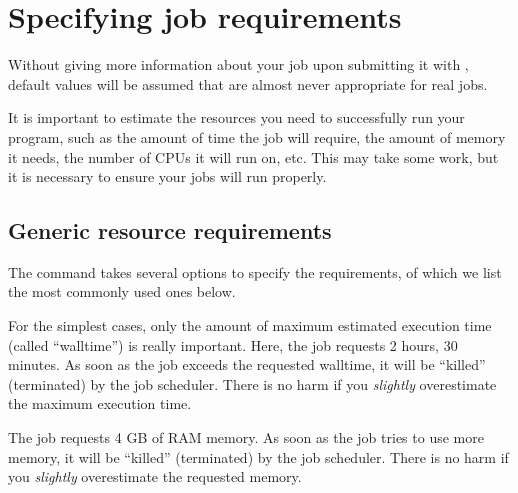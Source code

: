\section{Specifying job requirements}

Without giving more information about your job upon submitting it with
, default values will be assumed that are almost never appropriate
for real jobs.

It is important to estimate the resources you need to successfully run your
program, such as the amount of time the job will require, the amount of memory
it needs, the number of CPUs it will run on, etc. This may take some work, but
it is necessary to ensure your jobs will run properly.

\subsection{Generic resource requirements}
\label{subsec:generic-resource-requirements}

The  command takes several options to specify the requirements, of which we
list the most commonly used ones below. \\

\begin{prompt}
\end{prompt}

For the simplest cases, only the amount of maximum estimated execution time
(called ``walltime'') is really important. Here, the job requests
2 hours, 30 minutes. As soon as the job exceeds the requested walltime,
it will be ``killed'' (terminated) by the job scheduler.  There is no
harm if you \emph{slightly} overestimate the maximum execution time. \\

\begin{prompt}
\end{prompt}

The job requests 4 GB of RAM memory. As soon as the job tries to use more memory,
it will be ``killed'' (terminated) by the job scheduler.  There is no
harm if you \emph{slightly} overestimate the requested memory. \\
 \\

\begin{prompt}
\end{prompt}


